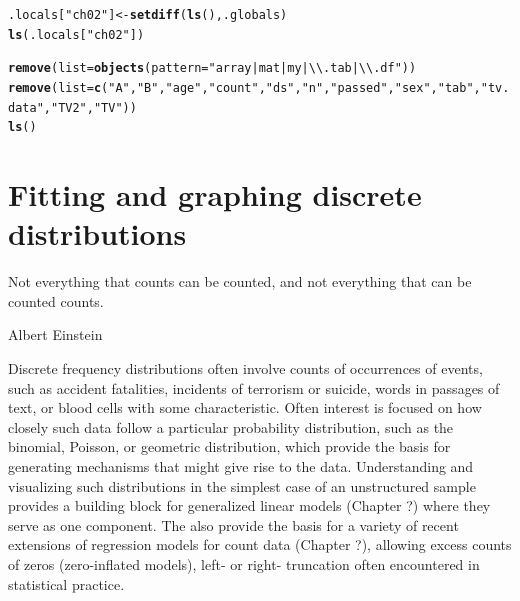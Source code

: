 \documentclass[11pt]{book}\usepackage[]{graphicx}\usepackage[]{color}
\makeatletter
\newcommand{\hlstr}[1]{\textcolor[rgb]{0.192,0.494,0.8}{#1}}%
\newcommand{\hlstd}[1]{\textcolor[rgb]{0.345,0.345,0.345}{#1}}%
\newcommand{\hlkwb}[1]{\textcolor[rgb]{0.69,0.353,0.396}{#1}}%
\newcommand{\hlkwc}[1]{\textcolor[rgb]{0.333,0.667,0.333}{#1}}%
\newcommand{\hlkwd}[1]{\textcolor[rgb]{0.737,0.353,0.396}{\textbf{#1}}}%
\newenvironment{kframe}{%
 \def\at@end@of@kframe{}%
 \ifinner\ifhmode%
  \def\at@end@of@kframe{\end{minipage}}%
  \begin{minipage}{\columnwidth}%
 \fi\fi%
 \def\FrameCommand##1{\hskip\@totalleftmargin \hskip-\fboxsep
 \colorbox{shadecolor}{##1}\hskip-\fboxsep
     \hskip-\linewidth \hskip-\@totalleftmargin \hskip\columnwidth}%
 \MakeFramed {\advance\hsize-\width
   \@totalleftmargin\z@ \linewidth\hsize
   \@setminipage}}%
 {\par\unskip\endMakeFramed%
 \at@end@of@kframe}
\newenvironment{knitrout}{}{} %
\renewenvironment{knitrout}{\small\renewcommand{\baselinestretch}{.85}}{} %
\makeatother
\begin{document}
\begin{knitrout}
\color{fgcolor}\begin{kframe}
\begin{alltt}
\hlstd{.locals[}\hlstr{"ch02"}\hlstd{]} \hlkwb{<-} \hlkwd{setdiff}\hlstd{(}\hlkwd{ls}\hlstd{(), .globals)}
\hlkwd{ls}\hlstd{(.locals[}\hlstr{"ch02"}\hlstd{])}

\hlkwd{remove}\hlstd{(}\hlkwc{list}\hlstd{=}\hlkwd{objects}\hlstd{(}\hlkwc{pattern}\hlstd{=}\hlstr{"array|mat|my|\textbackslash{}\textbackslash{}.tab|\textbackslash{}\textbackslash{}.df"}\hlstd{))}
\hlkwd{remove}\hlstd{(}\hlkwc{list}\hlstd{=}\hlkwd{c}\hlstd{(}\hlstr{"A"}\hlstd{,} \hlstr{"B"}\hlstd{,} \hlstr{"age"}\hlstd{,} \hlstr{"count"}\hlstd{,} \hlstr{"ds"}\hlstd{,} \hlstr{"n"}\hlstd{,} \hlstr{"passed"}\hlstd{,} \hlstr{"sex"}\hlstd{,} \hlstr{"tab"}\hlstd{,} \hlstr{"tv.data"}\hlstd{,} \hlstr{"TV2"}\hlstd{,} \hlstr{"TV"}\hlstd{))}
\hlkwd{ls}\hlstd{()}
\end{alltt}
\end{kframe}
\end{knitrout}







\chapter{Fitting and graphing discrete distributions}\label{ch:discrete}


\epigraph{Not everything that counts can be counted, and not everything that
can be counted counts.}
{Albert Einstein}

Discrete frequency distributions often involve counts of occurrences of events,
such as accident fatalities, incidents of terrorism or suicide,
words in passages of text, or blood cells with some characteristic.
Often interest is focused on how closely such data follow a particular probability distribution,
such as the binomial, Poisson, or geometric distribution, which
provide the basis for generating mechanisms that might give rise to the
data.
Understanding and visualizing
such distributions
in the simplest case of an unstructured sample provides a building block for generalized
linear models (Chapter ?) where they serve as one component.  The also provide the basis for
a variety of recent extensions of regression models for count data (Chapter ?),
allowing excess counts of zeros (zero-inflated models), left- or right-
truncation often encountered in statistical practice.
\end{document}
